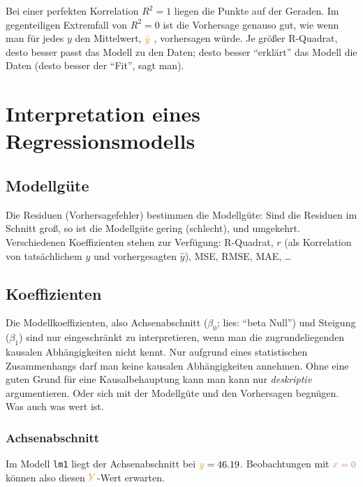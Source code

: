 \documentclass[
  letterpaper,
]{scrbook}
\theoremstyle{definition}
\theoremstyle{definition}
\theoremstyle{definition}
\theoremstyle{remark}
\begin{document}
Bei einer perfekten Korrelation \(R^2=1\) liegen die Punkte auf der
Geraden. Im gegenteiligen Extremfall von \(R^2=0\) ist die Vorhersage
genauso gut, wie wenn man für jedes \(y\) den Mittelwert,
{\(\color{ycol}{\bar{y}}\)} , vorhersagen würde. Je größer R-Quadrat,
desto besser passt das Modell zu den Daten; desto besser
\enquote{erklärt} das Modell die Daten (desto besser der \enquote{Fit},
sagt man).

\section{Interpretation eines
Regressionsmodells}\label{sec-interpret-reg-mod}

\subsection{Modellgüte}\label{modellguxfcte-1}

Die Residuen (Vorhersagefehler) bestimmen die Modellgüte: Sind die
Residuen im Schnitt groß, so ist die Modellgüte gering (schlecht), und
umgekehrt. Verschiedenen Koeffizienten stehen zur Verfügung: R-Quadrat,
\(r\) (als Korrelation von tatsächlichem \(y\) und vorhergesagten
\(\hat{y}\)), MSE, RMSE, MAE, \ldots{}

\subsection{Koeffizienten}\label{koeffizienten}

Die Modellkoeffizienten, also Achsenabschnitt (\(\beta_0\); lies:
\enquote{beta Null}) und Steigung (\(\beta_1\)) sind nur eingeschränkt
zu interpretieren, wenn man die zugrundeliegenden kausalen
Abhängigkeiten nicht kennt. Nur aufgrund eines statistischen
Zusammenhangs darf man keine kausalen Abhängigkeiten annehmen. Ohne eine
guten Grund für eine Kausalbehauptung kann man kann nur
\emph{deskriptiv} argumentieren. Oder sich mit der Modellgüte und den
Vorhersagen begnügen. Was auch was wert ist.

\subsubsection{Achsenabschnitt}\label{achsenabschnitt}

{Im Modell \texttt{lm1} liegt der Achsenabschnitt bei
\(\textcolor{ycol}{y}=46.19\). Beobachtungen mit \(\color{xcol}{x}=0\)
können also diesen \(\textcolor{ycol}{Y}\)-Wert erwarten.}
\end{document}
